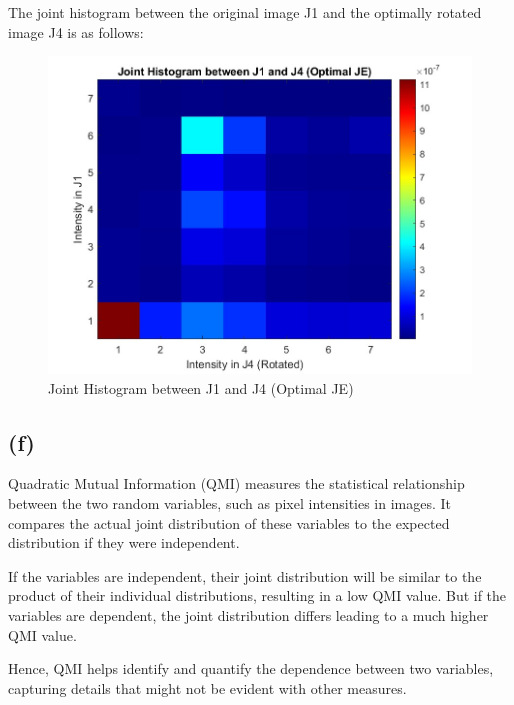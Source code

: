 \documentclass{article}
\begin{document}
The joint histogram between the original image J1 and the optimally rotated image J4 is as follows:
\begin{figure}[H]
\centering
\includegraphics[scale=0.3]{JointHist_Optimal_JE.jpg}
\caption{Joint Histogram between J1 and J4 (Optimal JE)}
\end{figure}

\subsection*{(f)}
Quadratic Mutual Information (QMI) measures the statistical relationship between the two random variables, such as pixel intensities in images. It compares the actual joint distribution of these variables to the expected distribution if they were independent.
\vspace{5pt}

If the variables are independent, their joint distribution will be similar to the product of their individual distributions, resulting in a low QMI value. But if the variables are dependent, the joint distribution differs leading to a much higher QMI value.
\vspace{5pt}

Hence, QMI helps identify and quantify the dependence between two variables, capturing details that might not be evident with other measures.
\end{document}
